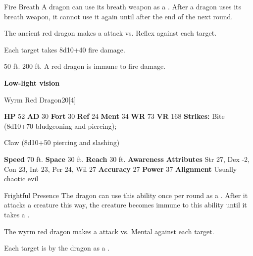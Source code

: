     \begin{freeability}{Fire Breath}
      A dragon can use its breath weapon as a .
      After a dragon uses its breath weapon, it cannot use it again until after the end of the next round.
      \par The ancient red dragon makes a  attack
        vs. Reflex against each target.
    
    \hit Each target takes 8d10+40 fire damage.
    \end{freeability}
  
      
       50 ft.
     200 ft.
     A red dragon is immune to fire damage.
    \par\noindent\textbf{Low-light vision}
  

  \begin{monsubsection}{Wyrm Red Dragon}{20}[4]
    \vspace{-1em}\vspace{-1em}
    \vspace{0em}

    
    

    \begin{spellcontent}
      \begin{spelltargetinginfo}
        \pari \textbf{HP} 52 \monsep
          \textbf{AD} 30 \monsep
          \textbf{Fort} 30 \monsep
          \textbf{Ref} 24 \monsep
          \textbf{Ment} 34
        \pari \textbf{WR} 73 \monsep
        \textbf{VR} 168
        \pari \textbf{Strikes:}
            Bite  (8d10+70 bludgeoning and piercing);
\par Claw  (8d10+50 piercing and slashing)
      \end{spelltargetinginfo}
    \end{spellcontent}
    \begin{monsterfooter}
      \pari \textbf{Speed} 70 ft. \monsep
        \textbf{Space} 30 ft. \monsep
        \textbf{Reach} 30 ft.
      \pari \textbf{Awareness} 
      \pari \textbf{Attributes}
        Str 27, Dex -2,
        Con 23, Int 23,
        Per 24, Wil 27
      \pari \textbf{Accuracy} 27 \monsep
        \textbf{Power} 37
      \pari \textbf{Alignment} Usually chaotic evil
    \end{monsterfooter}
  \end{monsubsection}
  \begin{freeability}{Frightful Presence}
      The dragon can use this ability once per round as a .
      After it attacks a creature this way, the creature becomes immune to this ability until it takes a .
      \par The wyrm red dragon makes a  attack
        vs. Mental against each target.
    
    \hit Each target is  by the dragon as a .
    \end{freeability}
  

